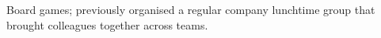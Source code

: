
\begin{cvparagraph}

Board games; previously organised a regular company lunchtime group that brought colleagues together across teams.
\end{cvparagraph}
